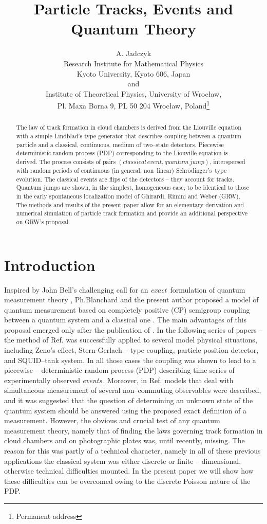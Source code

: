 \documentclass[12pt]{article}
\author{A. Jadczyk \\
 Research Institute for Mathematical
Physics\\ Kyoto University, Kyoto 606, Japan \\and\\
Institute of
Theoretical Physics, University of Wroc{\l }aw, \\ Pl. Maxa Borna 9, PL 50
204 Wroc{\l }aw, Poland\thanks{Permanent address}}
\title{Particle Tracks, Events and Quantum Theory}
\date{ }
\begin{document}
\maketitle
\begin{abstract} The law of track formation in cloud chambers is derived
from the Liouville equation with a simple Lindblad's type generator that
describes coupling between a quantum particle and a classical, continuous,
medium of two--state detectors. Piecewise deterministic random process
(PDP) corresponding to the Liouville equation is derived. The process
consists of pairs $(classical\, event, quantum\, jump)$, interspersed with
random periods of continuous (in general, non--linear)
Schr\"odinger's--type evolution. The classical events are flips of the
detectors -- they account for tracks. Quantum jumps are shown, in the
simplest, homogeneous case, to be identical to those in the early
spontaneous localization model of Ghirardi, Rimini and Weber (GRW). The
methods and results of the present paper allow for an elementary derivation
and numerical simulation of particle track formation and provide an
additional perspective on GRW's proposal. \end{abstract}
\newpage
\section{Introduction}
Inspired by John Bell's challenging call for an {\sl exact}\, formulation
of quantum measurement theory \cite{bel1,bel2}, Ph.Blanchard and the
present author proposed a model of quantum measurement based on completely
positive (CP) semigroup coupling between a quantum system and a classical
one \cite{bla1}. The main advantages of this proposal emerged only after
the publication of \cite{bla1}. In the following series of papers
\cite{bla2} -- \cite{bla5} the method of Ref. \cite{bla1} was successfully
applied to several model physical situations, including Zeno's effect,
Stern-Gerlach -- type coupling, particle position detector, and SQUID--tank
system. In all those cases the coupling was shown to lead to a piecewise --
deterministic random process (PDP) describing time series of experimentally
observed {\sl events}\,. Moreover, in Ref. \cite{jad1} models that deal
with simultaneous measurement of several non--commuting observables were
described, and it was suggested that the question of determining an unknown
state of the quantum system should be answered using the proposed exact
definition of a measurement. However, the obvious and crucial test of any
quantum measurement theory, namely that of finding the laws governing track
formation in cloud chambers and on photographic plates was, until recently,
missing. The reason for this was partly of a technical character, namely in
all of these previous applications the classical system was either discrete
or finite -- dimensional, otherwise technical difficulties mounted. In the
present paper we will show how these difficulties can be overcomed owing to
the discrete Poisson nature of the PDP.
\end{document}
